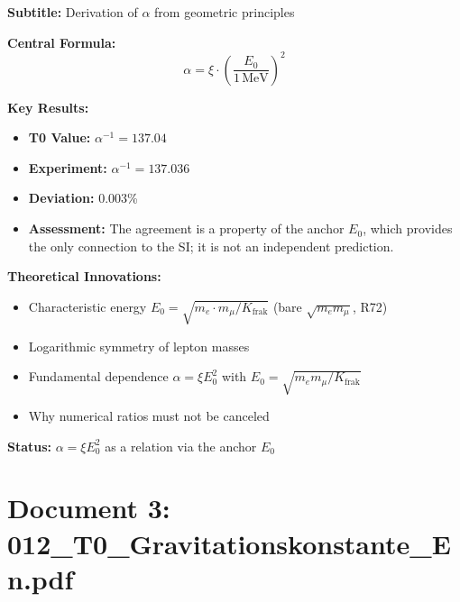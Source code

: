 	\begin{documentbox}
		\textbf{Subtitle:} Derivation of $\alpha$ from geometric principles
		
		\textbf{Central Formula:}
		\begin{equation}
			\boxed{\alpha = \xi \cdot \left(\frac{E_0}{1\,\text{MeV}}\right)^2}
		\end{equation}
		
		\textbf{Key Results:}
		\begin{itemize}
			\item \textbf{T0 Value:} $\alpha^{-1} = 137.04$
			\item \textbf{Experiment:} $\alpha^{-1} = 137.036$
			\item \textbf{Deviation:} 0.003\%
			\item \textbf{Assessment:} The agreement is a property of the anchor $E_0$, which provides the only connection to the SI; it is not an independent prediction.
		\end{itemize}
		
		\textbf{Theoretical Innovations:}
		\begin{itemize}
			\item Characteristic energy $E_0 = \sqrt{m_e \cdot m_\mu/K_{\text{frak}}}$ (bare $\sqrt{m_e m_\mu}$, R72)
			\item Logarithmic symmetry of lepton masses
			\item Fundamental dependence $\alpha = \xi E_0^2$ with $E_0 = \sqrt{m_e m_\mu/K_{\text{frak}}}$
			\item Why numerical ratios must not be canceled
		\end{itemize}
		
		\textbf{Status:} $\alpha = \xi E_0^2$ as a relation via the anchor $E_0$
	\end{documentbox}
	
	\section{Document 3: 012\_T0\_Gravitationskonstante\_En.pdf}
	
